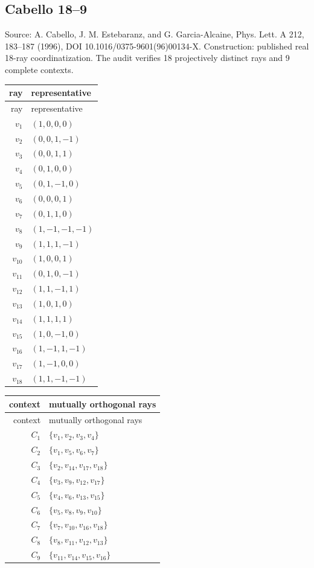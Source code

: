 \subsection{Cabello 18--9}
\begingroup\sloppy Source: A. Cabello, J. M. Estebaranz, and G. Garcia-Alcaine, Phys. Lett. A 212, 183--187 (1996), DOI 10.1016/0375-9601(96)00134-X.  Construction: published real 18-ray coordinatization. The audit verifies 18 projectively distinct rays and 9 complete contexts.\par\endgroup
\begin{longtable}{@{}r l@{}}
\toprule
ray & representative\\
\midrule
\endfirsthead
\toprule
ray & representative\\
\midrule
\endhead
$v_{1}$ & $(1,0,0,0)$\\
$v_{2}$ & $(0,0,1,-1)$\\
$v_{3}$ & $(0,0,1,1)$\\
$v_{4}$ & $(0,1,0,0)$\\
$v_{5}$ & $(0,1,-1,0)$\\
$v_{6}$ & $(0,0,0,1)$\\
$v_{7}$ & $(0,1,1,0)$\\
$v_{8}$ & $(1,-1,-1,-1)$\\
$v_{9}$ & $(1,1,1,-1)$\\
$v_{10}$ & $(1,0,0,1)$\\
$v_{11}$ & $(0,1,0,-1)$\\
$v_{12}$ & $(1,1,-1,1)$\\
$v_{13}$ & $(1,0,1,0)$\\
$v_{14}$ & $(1,1,1,1)$\\
$v_{15}$ & $(1,0,-1,0)$\\
$v_{16}$ & $(1,-1,1,-1)$\\
$v_{17}$ & $(1,-1,0,0)$\\
$v_{18}$ & $(1,1,-1,-1)$\\
\bottomrule
\end{longtable}
\begin{longtable}{@{}r l@{}}
\toprule
context & mutually orthogonal rays\\
\midrule
\endfirsthead
\toprule
context & mutually orthogonal rays\\
\midrule
\endhead
$C_{1}$ & $\{v_{1},v_{2},v_{3},v_{4}\}$\\
$C_{2}$ & $\{v_{1},v_{5},v_{6},v_{7}\}$\\
$C_{3}$ & $\{v_{2},v_{14},v_{17},v_{18}\}$\\
$C_{4}$ & $\{v_{3},v_{9},v_{12},v_{17}\}$\\
$C_{5}$ & $\{v_{4},v_{6},v_{13},v_{15}\}$\\
$C_{6}$ & $\{v_{5},v_{8},v_{9},v_{10}\}$\\
$C_{7}$ & $\{v_{7},v_{10},v_{16},v_{18}\}$\\
$C_{8}$ & $\{v_{8},v_{11},v_{12},v_{13}\}$\\
$C_{9}$ & $\{v_{11},v_{14},v_{15},v_{16}\}$\\
\bottomrule
\end{longtable}
